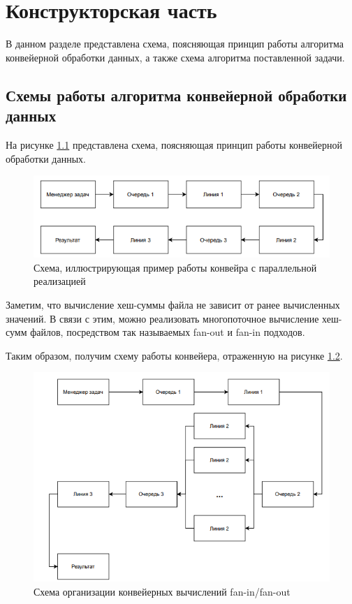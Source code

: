 \chapter{Конструкторская часть}
В данном разделе представлена схема, поясняющая принцип рабо­ты
алгоритма конвейерной обработки данных, а также схема алгоритма 
поставленной задачи.

\section{Схемы работы алгоритма конвейерной обработки данных}

На рисунке \ref{pic:schema-pipeline} представлена схема, поясняющая принцип работы
конвейерной обработки данных.

\begin{figure}[!htb]
	\centering
	\includegraphics[scale=0.55]{imgs/3}
	\caption{Схема, иллюстрирующая пример работы конвейра с
	параллельной реализацией}
	\label{pic:schema-pipeline}
\end{figure}


Заметим, что вычисление хеш-суммы файла не зависит от ранее вычисленных
значений. В связи с этим, можно реализовать многопоточное вычисление хеш-сумм файлов,
посредством так называемых fan-out и fan-in подходов.

Таким образом, получим схему работы конвейера, отраженную на рисунке \ref{pic:schema-fanin-fanout}.
\begin{figure}[!htb]
	\centering
	\includegraphics[scale=0.55]{imgs/4}
	\caption{Схема организации конвейерных вычислений fan-in/fan-out}
	\label{pic:schema-fanin-fanout}
\end{figure}



